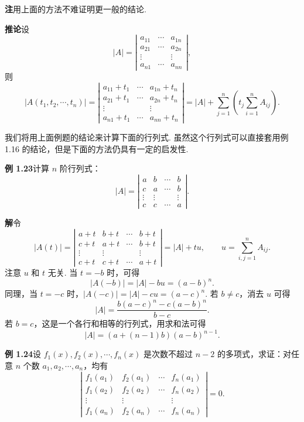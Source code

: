 \documentclass[UTF8, 12pt, fontset=fandol, oneside]{ctexart}
\begin{document}
\noindent\textbf{注}\quad 用上面的方法不难证明更一般的结论.

\noindent\textbf{推论}\quad 设
\[
|A|=\left|\begin{array}{ccc}
a_{11} & \cdots & a_{1n}\\
a_{21} & \cdots & a_{2n}\\
\vdots &        & \vdots\\
a_{n1} & \cdots & a_{nn}
\end{array}\right|,
\]
则
\[
|A(t_1,t_2,\cdots,t_n)|
=\left|\begin{array}{ccc}
a_{11}+t_1 & \cdots & a_{1n}+t_n\\
a_{21}+t_1 & \cdots & a_{2n}+t_n\\
\vdots &        & \vdots\\
a_{n1}+t_1 & \cdots & a_{nn}+t_n
\end{array}\right|
=|A|+\sum_{j=1}^n\left(t_j\sum_{i=1}^n A_{ij}\right).
\]

我们将用上面例题的结论来计算下面的行列式. 虽然这个行列式可以直接套用例 1.16 的结论，但是下面的方法仍具有一定的启发性.

\noindent\textbf{例 1.23}\quad 计算 $n$ 阶行列式：
\[
|A|=\left|\begin{array}{cccc}
a & b & \cdots & b\\
c & a & \cdots & b\\
\vdots & \vdots &        & \vdots\\
c & c & \cdots & a
\end{array}\right|.
\]

\noindent\textbf{解}\quad 令
\[
|A(t)|=\left|\begin{array}{cccc}
a+t & b+t & \cdots & b+t\\
c+t & a+t & \cdots & b+t\\
\vdots & \vdots &        & \vdots\\
c+t & c+t & \cdots & a+t
\end{array}\right|=|A|+tu,\qquad u=\sum_{i,j=1}^n A_{ij}.
\]
注意 $u$ 和 $t$ 无关. 当 $t=-b$ 时，可得
\[
|A(-b)|=|A|-bu=(a-b)^n.
\]
同理，当 $t=-c$ 时，$|A(-c)|=|A|-cu=(a-c)^n$. 若 $b\ne c$，消去 $u$ 可得
\[
|A|=\frac{b(a-c)^n-c(a-b)^n}{b-c}.
\]
若 $b=c$，这是一个各行和相等的行列式，用求和法可得
\[
|A|=(a+(n-1)b)(a-b)^{n-1}.
\]

\noindent\textbf{例 1.24}\quad 设 $f_1(x),f_2(x),\cdots,f_n(x)$ 是次数不超过 $n-2$ 的多项式，求证：对任意 $n$ 个数 $a_1,a_2,\cdots,a_n$，均有
\[
\left|\begin{array}{cccc}
f_1(a_1) & f_2(a_1) & \cdots & f_n(a_1)\\
f_1(a_2) & f_2(a_2) & \cdots & f_n(a_2)\\
\vdots & \vdots &        & \vdots\\
f_1(a_n) & f_2(a_n) & \cdots & f_n(a_n)
\end{array}\right|=0.
\]
\end{document}
